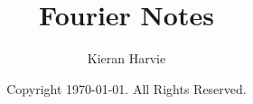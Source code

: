 \documentclass[12pt]{report}
\title{Fourier Notes}
\date{Copyright \textcopyright  \today. All Rights Reserved.}
\author{Kieran Harvie}
\begin{document}
\maketitle
\tableofcontents






\renewcommand{\thechapter}{A}

\end{document}
